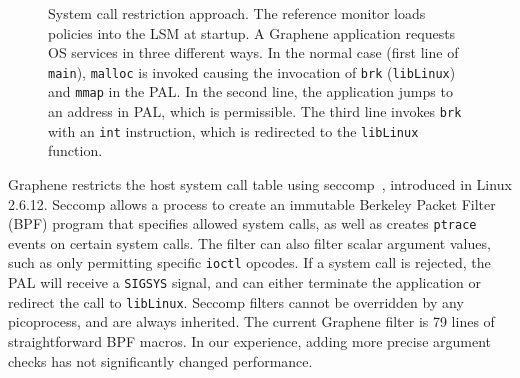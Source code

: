 
\begin{figure}[t!]
\centering
\footnotesize
\caption{System call restriction approach. The reference monitor loads policies into the LSM at startup.  A Graphene application requests OS services in three different ways. 
In the normal case (first line of {\tt main}), {\tt malloc} is invoked causing the invocation of {\tt brk} ({\tt libLinux}) and {\tt mmap} in the PAL. In the second line, the application jumps to an address in PAL, which is permissible.
The third line invokes {\tt brk} with an {\tt int} instruction, which is redirected to the {\tt libLinux} function.
\label{fig:syscall_restriction}}
\end{figure}



Graphene restricts the host system call table 
using seccomp~\cite{seccomp}, introduced in Linux 2.6.12.
Seccomp allows a process to create an immutable Berkeley Packet Filter (BPF) program
that specifies allowed system calls, as well as creates {\tt ptrace} 
events on certain system calls.
The filter can also filter scalar argument values,
such as only permitting specific {\tt ioctl} opcodes.
If a system call is rejected, the PAL will receive a {\tt SIGSYS} signal,
and can either terminate the application or redirect the 
call to {\tt libLinux}.
Seccomp filters cannot be overridden by any picoprocess,
and are always inherited.
The current Graphene filter is 79 lines 
of straightforward BPF macros.  In our experience, adding more precise argument checks
has not significantly changed performance.


